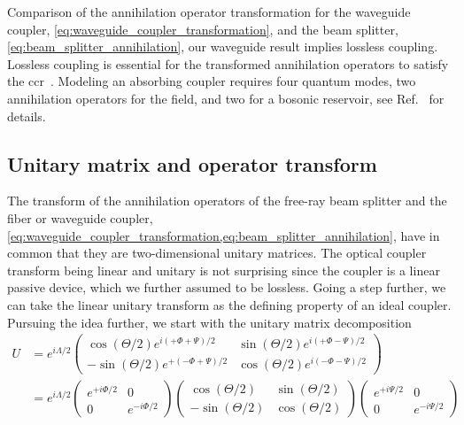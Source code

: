 Comparison of the annihilation operator transformation for the waveguide coupler, \cref{eq:waveguide_coupler_transformation}, and the beam splitter, \cref{eq:beam_splitter_annihilation}, our waveguide result implies lossless coupling.
Lossless coupling is essential for the transformed annihilation operators to satisfy the \gls{ccr}~\cite[p.~38]{Gerry2005}.
Modeling an absorbing coupler requires four quantum modes, two annihilation operators for the field, and two for a bosonic reservoir, see Ref.~\cite[p.~210]{Vogel2006} for details.

\subsection{Unitary matrix and operator transform}

The transform of the annihilation operators of the free-ray beam splitter and the fiber or waveguide coupler, \cref{eq:waveguide_coupler_transformation,eq:beam_splitter_annihilation}, have in common that they are two-dimensional unitary matrices.
The optical coupler transform being linear and unitary is not surprising since the coupler is a linear passive device, which we further assumed to be lossless.
Going a step further, we can take the linear unitary transform as the defining property of an ideal coupler.
Pursuing the idea further, we start with the unitary matrix decomposition~\cite[p.~95]{Leonhardt2010}
\begin{equation}
	\begin{split}
		U
		&=
		e^{i\Lambda/2}
		\begin{pmatrix}
			\cos(\Theta/2)e^{i(+\Phi+\Psi)/2} & \sin(\Theta/2)e^{i(+\Phi-\Psi)/2} \\
			-\sin(\Theta/2)e^{+(-\Phi+\Psi)/2} & \cos(\Theta/2)e^{i(-\Phi-\Psi)/2}
		\end{pmatrix}
		\\
		&=
		e^{i\Lambda/2}
		\begin{pmatrix}
			e^{+i\Phi/2} & 0 \\
			0 & e^{-i\Phi/2}
		\end{pmatrix}
		\begin{pmatrix}
			\cos(\Theta/2) & \sin(\Theta/2) \\
			-\sin(\Theta/2) & \cos(\Theta/2)
		\end{pmatrix}
		\begin{pmatrix}
			e^{+i\Psi/2} & 0 \\
			0 & e^{-i\Psi/2}
		\end{pmatrix}
	\end{split}
	\label{eq:unitary_matrix}
\end{equation}

